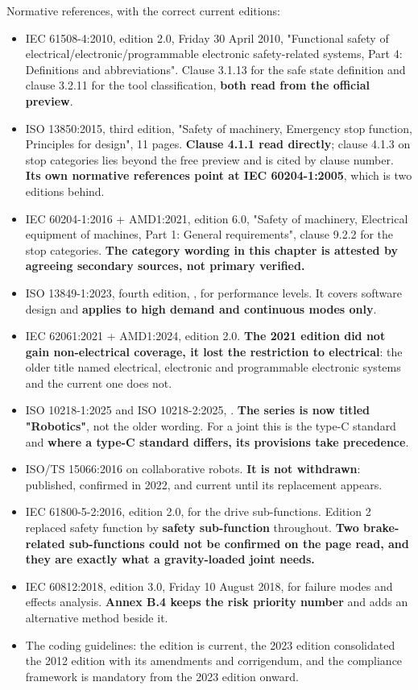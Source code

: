 Normative references, with the correct current editions:
\begin{itemize}
\item IEC 61508-4:2010, edition 2.0, Friday 30 April 2010, "Functional safety of
electrical/electronic/programmable electronic safety-related systems, Part 4:
Definitions and abbreviations". Clause 3.1.13 for the safe state definition and
clause 3.2.11 for the tool classification, \textbf{both read from the official
preview}.
\item ISO 13850:2015, third edition, "Safety of machinery, Emergency stop
function, Principles for design", 11 pages. \textbf{Clause 4.1.1 read directly};
clause 4.1.3 on stop categories lies beyond the free preview and is cited by
clause number. \textbf{Its own normative references point at IEC 60204-1:2005},
which is two editions behind.
\item IEC 60204-1:2016 + AMD1:2021, edition 6.0, "Safety of machinery,
Electrical equipment of machines, Part 1: General requirements", clause 9.2.2
for the stop categories. \textbf{The category wording in this chapter is attested
by agreeing secondary sources, not primary verified.}
\item ISO 13849-1:2023, fourth edition, , for performance levels. It
covers software design and \textbf{applies to high demand and continuous modes
only}.
\item IEC 62061:2021 + AMD1:2024, edition 2.0. \textbf{The 2021 edition did not
gain non-electrical coverage, it lost the restriction to electrical}: the older
title named electrical, electronic and programmable electronic systems and the
current one does not.
\item ISO 10218-1:2025 and ISO 10218-2:2025, . \textbf{The series is
now titled "Robotics"}, not the older wording. For a joint this is the type-C
standard and \textbf{where a type-C standard differs, its provisions take
precedence}.
\item ISO/TS 15066:2016 on collaborative robots. \textbf{It is not withdrawn}:
published, confirmed in 2022, and current until its replacement appears.
\item IEC 61800-5-2:2016, edition 2.0, for the drive sub-functions. Edition 2
replaced safety function by \textbf{safety sub-function} throughout.
\textbf{Two brake-related sub-functions could not be confirmed on the page read,
and they are exactly what a gravity-loaded joint needs.}
\item IEC 60812:2018, edition 3.0, Friday 10 August 2018, for failure modes and
effects analysis. \textbf{Annex B.4 keeps the risk priority number} and adds an
alternative method beside it.
\item The coding guidelines: the  edition is current, the 2023 edition
consolidated the 2012 edition with its amendments and corrigendum, and the
compliance framework is mandatory from the 2023 edition onward.
\end{itemize}


